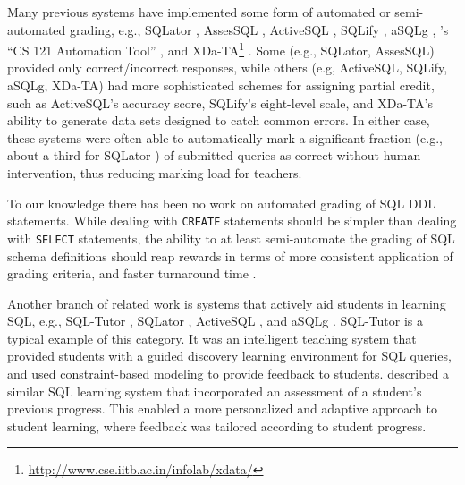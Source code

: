 \documentclass[sigconf, authordraft, capitalise]{acmart}
\begin{document}
Many previous systems have implemented some form of automated or semi-automated grading, e.g., SQLator \cite{Sadiq.S-2004a-SQLator}, AssesSQL \cite{Prior.J-2004a-Backwash}, ActiveSQL \cite{Russell.G-2004a-Improving,Russell.G-2005a-Online}, SQLify \cite{Dekeyser.S-2007a-Computer}, aSQLg \cite{Kleiner.C-2013a-Automated}, \citeauthor{Gong.A-2015a-CS-121-Automation}'s ``CS 121 Automation Tool'' \cite{Gong.A-2015a-CS-121-Automation}, and XDa-TA\footnote{\url{http://www.cse.iitb.ac.in/infolab/xdata/}} \cite{Bhangdiya.A-2015a-XDa-TA,Chandra.B-2015a-Data,Chandra.B-2016a-Partial}. Some (e.g., SQLator, AssesSQL) provided only correct/incorrect responses, while others (e.g, ActiveSQL, SQLify, aSQLg, XDa-TA) had more sophisticated schemes for assigning partial credit, such as ActiveSQL's accuracy score, SQLify's eight-level scale, and XDa-TA's ability to generate data sets designed to catch common errors. In either case, these systems were often able to automatically mark a significant fraction (e.g., about a third for SQLator \cite{Sadiq.S-2004a-SQLator}) of submitted queries as correct without human intervention, thus reducing marking load for teachers.

To our knowledge there has been no work on automated grading of SQL DDL statements. While dealing with \texttt{CREATE} statements should be simpler than dealing with \texttt{SELECT} statements, the ability to at least semi-automate the grading of SQL schema definitions should reap rewards in terms of more consistent application of grading criteria, and faster turnaround time \cite{Douce.C-2005a-Automatic,Russell.G-2004a-Improving,Dekeyser.S-2007a-Computer,Prior.J-2004a-Backwash}.

Another branch of related work is systems that actively aid students in learning SQL, e.g., SQL-Tutor \cite{Mitrovic.A-1998a-Learning}, SQLator \cite{Sadiq.S-2004a-SQLator}, ActiveSQL \cite{Russell.G-2004a-Improving}, and aSQLg \cite{Kleiner.C-2013a-Automated}. SQL-Tutor is a typical example of this category. It was an intelligent teaching system that provided students with a guided discovery learning environment for SQL queries, and used constraint-based modeling \cite{Ohlsson.S-1992a-Constraint-based,Ohlsson.S-2016a-Constraint-based} to provide feedback to students. \citeauthor{Kenny.C-2005a-Automated} \cite{Kenny.C-2005a-Automated} described a similar SQL learning system that incorporated an assessment of a student's previous progress. This enabled a more personalized and adaptive approach to student learning, where feedback was tailored according to student progress.
\end{document}
